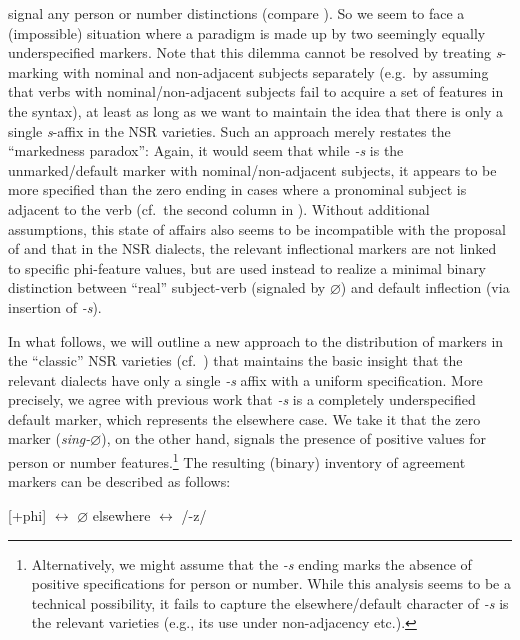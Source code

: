 \documentclass[output=paper]{langsci/langscibook}
\begin{document}
signal any person or number distinctions (compare ). So
we seem to face a (impossible) situation where a paradigm is made up by two
seemingly equally underspecified markers. Note that this dilemma cannot be
resolved by treating \emph{s}-marking with nominal and non-adjacent subjects
separately (e.g.\ by assuming that verbs with nominal/non-adjacent subjects fail
to acquire a set of  features in the syntax), at least as long as we
want to maintain the idea that there is only a single \emph{s}-affix in the
\gls{NSR} varieties. Such an approach merely restates the ``markedness
paradox'': Again, it would seem that while \emph{-s} is the unmarked/default
marker with nominal/non-adjacent subjects, it appears to be more specified than
the zero ending in cases where a pronominal subject is adjacent to the verb
(cf.\ the second column in ). Without additional assumptions,
this state of affairs also seems to be incompatible with the proposal of
\textcite{deHaas:2011} and \textcite{deHaasandvanKemenade:2015} that in the
\gls{NSR} dialects, the relevant inflectional markers are not linked to
specific phi-feature values, but are used instead to realize a minimal binary
distinction between ``real'' subject-verb  (signaled by $\varnothing$) and default
inflection (via insertion of \emph{-s}).\largerpage

In what follows, we will outline a new approach to the distribution of markers
in the ``classic'' \gls{NSR} varieties (cf.\ ) that maintains the basic
insight that the relevant dialects have only a single \emph{-s} affix with a
uniform specification. More precisely, we agree with previous work that
\emph{-s} is a completely underspecified default marker, which represents the
elsewhere case. We take it that the zero marker (\emph{sing-$\varnothing$}), on the
other hand, signals the presence of positive values for person or number
features.\footnote{Alternatively, we might assume that the \emph{-s} ending
    marks the absence of positive specifications for person or number. While this
    analysis seems to be a technical possibility, it fails to capture the
    elsewhere/default character of \emph{-s} is the relevant varieties
(e.g., its use under non-adjacency etc.).} The resulting (binary) inventory of
agreement markers can be described as follows:

\ea\label{ex:10:5}
\ea \mbox{[+phi]} $\leftrightarrow$ $\varnothing$
\ex elsewhere $\leftrightarrow$ /-z/
\z
\z
\end{document}
